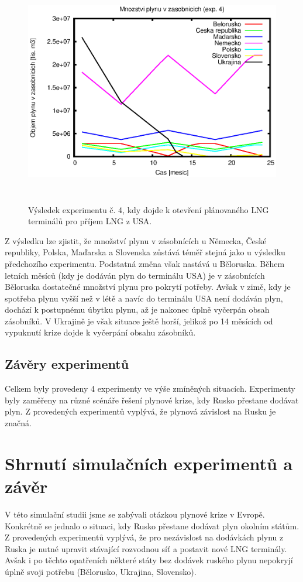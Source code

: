 \documentclass[a4paper,12pt]{article}
\begin{document}
  \begin{figure}[!ht]
    \centering
    \includegraphics[height=10cm]{img/3O.eps}
    \caption{Výsledek experimentu č. 4, kdy dojde k otevření plánovaného LNG terminálů pro příjem LNG z USA.}
    \label{img:exp4}
  \end{figure}
  
  Z výsledku lze zjistit, že množství plynu v zásobnících u Německa, České republiky, Polska, Maďarska a Slovenska zůstává téměř stejná
  jako u výsledku předchozího experimentu. Podstatná změna však nastává u Běloruska. Během letních měsíců (kdy je dodáván 
  plyn do terminálu USA) je v zásobnících Běloruska dostatečné množství plynu pro pokrytí potřeby. Avšak v zimě, kdy je 
  spotřeba plynu vyšší než v létě a navíc do terminálu USA není dodáván plyn, dochází k postupnému úbytku plynu, až je 
  nakonec úplně vyčerpán obsah zásobníků. V Ukrajině je však situace ještě horší, jelikož po 14 měsících od vypuknutí krize
  dojde k vyčerpání obsahu zásobníků.
  
  \subsection{Závěry experimentů}
  Celkem byly provedeny 4 experimenty ve výše zmíněných situacích. Experimenty byly zaměřeny na různé scénáře řešení plynové 
  krize, kdy Rusko přestane dodávat plyn. Z provedených experimentů vyplývá, že plynová závislost 
  na Rusku je značná. 
  
  \section{Shrnutí simulačních experimentů a závěr}
  V této simulační studii jsme se zabývali otázkou plynové krize v Evropě. Konkrétně se jednalo o situaci, kdy 
  Rusko přestane dodávat plyn okolním státům. Z provedených experimentů vyplývá, že pro nezávislost na dodávkách plynu z 
  Ruska je nutné upravit stávající rozvodnou síť a postavit nové LNG terminály. Avšak
  i po těchto opatřeních některé státy bez dodávek ruského plynu nepokryjí úplně svoji potřebu (Bělorusko, Ukrajina, Slovensko).
  
  {}
  
\end{document}
